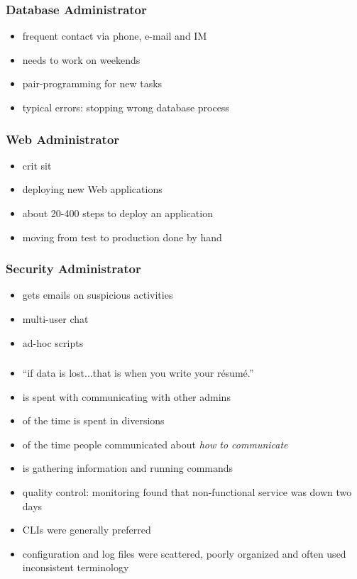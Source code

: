 \begin{frame}
	\frametitle{Database Administrator~\cite{haber2007design}}

	\begin{itemize}[<+-| alert@+>]
	\item frequent contact via phone, e-mail and IM
	\item needs to work on weekends
	\item pair-programming for new tasks
	\item typical errors: stopping wrong database process
	\end{itemize}
\end{frame}

\begin{frame}
	\frametitle{Web Administrator~\cite{haber2007design}}

	\begin{itemize}[<+-| alert@+>]
	\item crit sit
	\item deploying new Web applications
	\item about 20-400 steps to deploy an application
	\item moving from test to production done by hand
	\end{itemize}
\end{frame}

\begin{frame}
	\frametitle{Security Administrator~\cite{haber2007design}}

	\begin{itemize}[<+-| alert@+>]
	\item gets emails on suspicious activities
	\item multi-user chat
	\item ad-hoc scripts
	\end{itemize}
\end{frame}


\begin{frame}
	\frametitle{\citet{haber2007design}}

	\begin{itemize}[<+-| alert@+>]
	\item ``if data is lost...that is when you write your résumé.''
	\item {} is spent with communicating with other admins
	\item {} of the time is spent in diversions~\cite{barrett2004field}
	\item {} of the time people communicated about \emph{how to communicate}~\cite{barrett2004field}
	\item {} is gathering information and running commands
	\item quality control: monitoring found that non-functional service was down two days
	\item CLIs were generally preferred
	\item configuration and log files were scattered, poorly organized and often used inconsistent terminology
	\end{itemize}
\end{frame}


